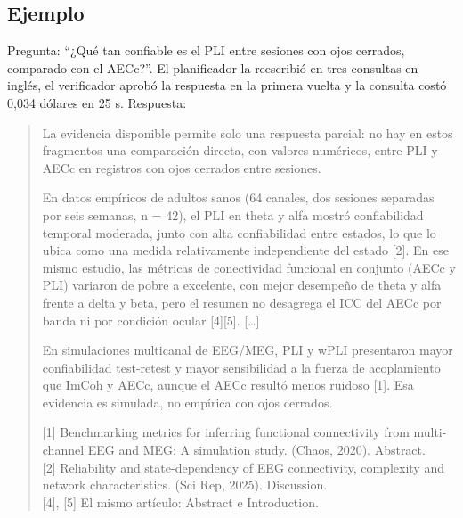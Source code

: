 \subsection{Ejemplo}

Pregunta: ``¿Qué tan confiable es el PLI entre sesiones con ojos cerrados, comparado con el AECc?''.
El planificador la reescribió en tres consultas en inglés, el verificador aprobó la respuesta en la
primera vuelta y la consulta costó 0,034 dólares en 25 s. Respuesta:

\begin{quote}\small
La evidencia disponible permite solo una respuesta parcial: no hay en estos fragmentos una
comparación directa, con valores numéricos, entre PLI y AECc en registros con ojos cerrados entre
sesiones.

En datos empíricos de adultos sanos (64 canales, dos sesiones separadas por seis semanas, n = 42),
el PLI en theta y alfa mostró confiabilidad temporal moderada, junto con alta confiabilidad entre
estados, lo que lo ubica como una medida relativamente independiente del estado [2]. En ese mismo
estudio, las métricas de conectividad funcional en conjunto (AECc y PLI) variaron de pobre a
excelente, con mejor desempeño de theta y alfa frente a delta y beta, pero el resumen no desagrega el
ICC del AECc por banda ni por condición ocular [4][5]. [\ldots]

En simulaciones multicanal de EEG/MEG, PLI y wPLI presentaron mayor confiabilidad test-retest y
mayor sensibilidad a la fuerza de acoplamiento que ImCoh y AECc, aunque el AECc resultó menos ruidoso
[1]. Esa evidencia es simulada, no empírica con ojos cerrados.

[1] Benchmarking metrics for inferring functional connectivity from multi-channel EEG and MEG: A
simulation study. (Chaos, 2020). Abstract.\\
{[2]} Reliability and state-dependency of EEG connectivity, complexity and network characteristics.
(Sci Rep, 2025). Discussion.\\
{[4]}, {[5]} El mismo artículo: Abstract e Introduction.
\end{quote}
